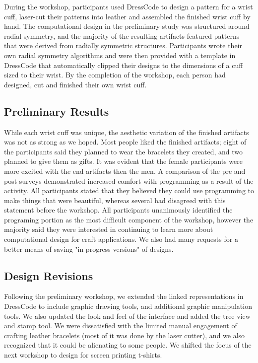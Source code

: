 \documentclass{sigchi}
\begin{document}
During the workshop, participants used DressCode to design a pattern for a wrist cuff, laser-cut their patterns into leather and assembled the finished wrist cuff by hand. The computational design in the preliminary study was structured around radial symmetry, and the majority of the resulting artifacts featured patterns that were derived from radially symmetric structures. Participants wrote their own radial symmetry algorithms and were then provided with a template in DressCode that automatically clipped their designs to the dimensions of a cuff sized to their wrist. By the completion of the workshop, each person had designed, cut and finished their own wrist cuff.

\subsection{Preliminary Results}
 While each wrist cuff was unique, the aesthetic variation of the finished artifacts was not as strong as we hoped. Most people liked the finished artifacts; eight of the participants said they planned to wear the bracelets they created, and two planned to give them as gifts. It was evident that the female participants were more excited with the end artifacts then the men. A comparison of the pre and post surveys demonstrated increased comfort with programming as a result of the activity. All participants stated that they believed they could use programming to make things that were beautiful, whereas several had disagreed with this statement before the workshop. All participants unanimously identified the programing portion as the most difficult component of the workshop, however the majority said they were interested in continuing to learn more about computational design for craft applications. We also had many requests for a better means of saving "in progress versions" of designs. 

\subsection{Design Revisions} Following the preliminary workshop, we extended the linked representations in DressCode to include graphic drawing tools, and additional graphic manipulation tools. We also updated the look and feel of the interface and added the tree view and stamp tool. We were dissatisfied with the limited manual engagement of crafting leather bracelets (most of it was done by the laser cutter), and we also recognized that it could be alienating to some people. We shifted the focus of the next workshop to design for screen printing t-shirts.
\end{document}

